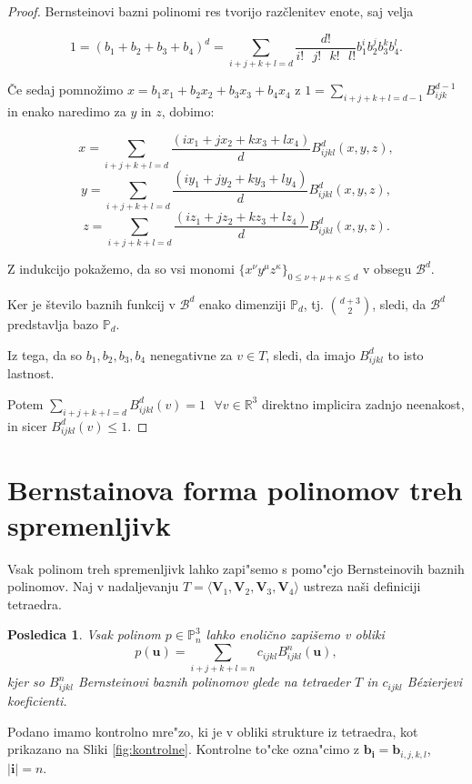 \documentclass[12pt,a4paper]{amsart}
\theoremstyle{definition} %
\theoremstyle{plain} %
\newtheorem{corollary}{Posledica}[theorem]
\begin{document}
\begin{proof}
  Bernsteinovi bazni polinomi res tvorijo razčlenitev enote, saj velja

  $$
  1 = (b_1+b_2+b_3+b_4)^d = \sum_{i+j+k+l=d}\frac{d!}{i!\text{ }j!\text{ }k!\text{ }l!}b_1^ib_2^jb_3^kb_4^l.
  $$

  Če sedaj pomnožimo $x=b_1x_1+b_2x_2+b_3x_3+b_4x_4$ z
  $1 = \sum_{i+j+k+l=d-1}B_{ijk}^{d-1}$ in enako naredimo za 
  $y$ in $z$, dobimo:

  $$
  x = \sum_{i+j+k+l=d}\frac{(ix_1+jx_2+kx_3+lx_4)}{d}B_{ijkl}^d(x,y,z),
  $$
  $$
  y = \sum_{i+j+k+l=d}\frac{(iy_1+jy_2+ky_3+ly_4)}{d}B_{ijkl}^d(x,y,z),
  $$
  $$
  z = \sum_{i+j+k+l=d}\frac{(iz_1+jz_2+kz_3+lz_4)}{d}B_{ijkl}^d(x,y,z).
  $$

  Z indukcijo pokažemo, da so vsi monomi 
  $\{x^\nu y^\mu z^\kappa\}_{0\leq \nu+\mu+\kappa\leq d}$
  v obsegu $\mathcal{B}^d$.

  Ker je število baznih funkcij v $\mathcal{B}^d$ enako 
  dimenziji $\mathbb{P}_d$, tj. $\binom{d+3}{2}$, sledi, da  
  $\mathcal{B}^d$ predstavlja bazo $\mathbb{P}_d$.
  
  Iz tega, da so $b_1,b_2,b_3,b_4$ nenegativne za $v\in T$, sledi,
  da imajo $B_{ijkl}^d$ to isto lastnost. 

  Potem $\sum_{i+j+k+l=d}B_{ijkl}^d(v)=1\text{ }\forall v\in\mathbb{R}^3$ 
  direktno implicira zadnjo neenakost, in sicer $B_{ijkl}^d(v)\leq1$.
\end{proof}

\section{Bernstainova forma polinomov treh spremenljivk}
Vsak polinom treh spremenljivk lahko zapi"semo s pomo"cjo Bernsteinovih baznih polinomov. 
Naj v nadaljevanju $T = \langle\textbf{V}_{1}, \textbf{V}_{2}, \textbf{V}_{3}, \textbf{V}_{4}\rangle$ ustreza naši definiciji tetraedra.  

\begin{corollary}
Vsak polinom $p \in \mathbb{P}^{3}_{n}$ lahko enolično zapišemo v obliki
\begin{equation*} %
p(\textbf{u}) = \sum_{i + j + k + l = n}c_{ijkl}B^{n}_{ijkl}(\textbf{u}),
\end{equation*}
kjer so $B^{n}_{ijkl}$ Bernsteinovi baznih polinomov glede na tetraeder $T$ in $c_{ijkl}$ Bézierjevi koeficienti.
\end{corollary}

Podano imamo kontrolno mre"zo, ki je v obliki strukture iz tetraedra, kot prikazano na Sliki \ref{fig:kontrolne}. 
Kontrolne to"cke ozna"cimo z $\textbf{b}_{\textbf{i}} = \textbf{b}_{i,j,k,l}$, $|\textbf{i}| = n$. 
\end{document}
